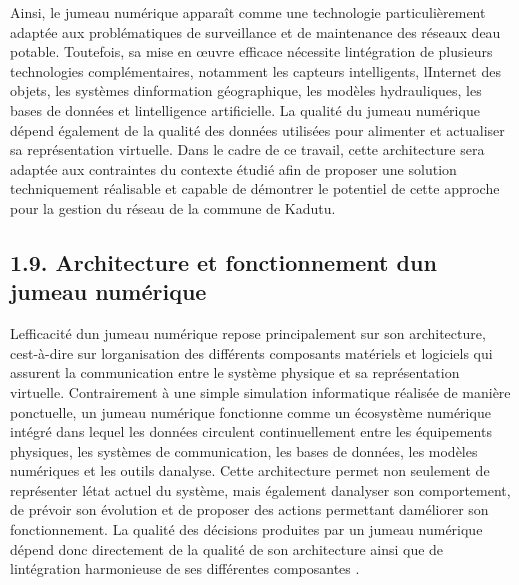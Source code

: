 \documentclass[12pt,a4paper,oneside]{report}
\begin{document}
Ainsi, le jumeau numérique apparaît comme une technologie
particulièrement adaptée aux problématiques de surveillance et de
maintenance des réseaux d\textquotesingle eau potable. Toutefois, sa
mise en œuvre efficace nécessite l\textquotesingle intégration de
plusieurs technologies complémentaires, notamment les capteurs
intelligents, l\textquotesingle Internet des objets, les systèmes
d\textquotesingle information géographique, les modèles hydrauliques,
les bases de données et l\textquotesingle intelligence artificielle. La
qualité du jumeau numérique dépend également de la qualité des données
utilisées pour alimenter et actualiser sa représentation virtuelle. Dans
le cadre de ce travail, cette architecture sera adaptée aux contraintes
du contexte étudié afin de proposer une solution techniquement
réalisable et capable de démontrer le potentiel de cette approche pour
la gestion du réseau de la commune de Kadutu.

\subsection{\texorpdfstring{\textbf{1.9. Architecture et fonctionnement
d\textquotesingle un jumeau
numérique}}{1.9. Architecture et fonctionnement d\textquotesingle un jumeau numérique}}\label{architecture-et-fonctionnement-dun-jumeau-numuxe9rique}

L\textquotesingle efficacité d\textquotesingle un jumeau numérique
repose principalement sur son architecture, c\textquotesingle est-à-dire
sur l\textquotesingle organisation des différents composants matériels
et logiciels qui assurent la communication entre le système physique et
sa représentation virtuelle. Contrairement à une simple simulation
informatique réalisée de manière ponctuelle, un jumeau numérique
fonctionne comme un écosystème numérique intégré dans lequel les données
circulent continuellement entre les équipements physiques, les systèmes
de communication, les bases de données, les modèles numériques et les
outils d\textquotesingle analyse. Cette architecture permet non
seulement de représenter l\textquotesingle état actuel du système, mais
également d\textquotesingle analyser son comportement, de prévoir son
évolution et de proposer des actions permettant
d\textquotesingle améliorer son fonctionnement. La qualité des décisions
produites par un jumeau numérique dépend donc directement de la qualité
de son architecture ainsi que de l\textquotesingle intégration
harmonieuse de ses différentes composantes \cite{ref60}.
\end{document}
